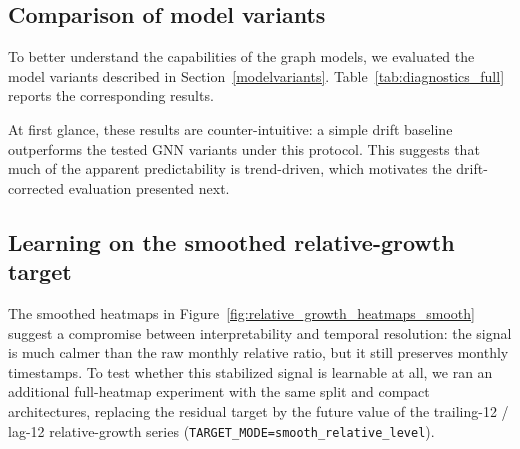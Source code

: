 \documentclass{article}
\begin{document}
\subsection{Comparison of model variants}
To better understand the capabilities of the graph models, we evaluated the model variants described in Section~\ref{modelvariants}. Table~\ref{tab:diagnostics_full} reports the corresponding results.
\begin{table}[H]
\centering
\caption{Evaluation results under \texttt{TARGET\_MODE=residual} from the full-heatmap run (\texttt{run\_id=exp\_residual\_diag\_fullheatmap\_20260307}, 532 active keywords).}
\label{tab:diagnostics_full}
\end{table}
At first glance, these results are counter-intuitive: a simple drift baseline outperforms the tested GNN variants under this protocol. This suggests that much of the apparent predictability is trend-driven, which motivates the drift-corrected evaluation presented next. 

\subsection{Learning on the smoothed relative-growth target}
The smoothed heatmaps in Figure~\ref{fig:relative_growth_heatmaps_smooth} suggest a compromise between interpretability and temporal resolution: the signal is much calmer than the raw monthly relative ratio, but it still preserves monthly timestamps. To test whether this stabilized signal is learnable at all, we ran an additional full-heatmap experiment with the same split and compact architectures, replacing the residual target by the future value of the trailing-12 / lag-12 relative-growth series (\texttt{TARGET\_MODE=smooth\_relative\_level}).
\end{document}
